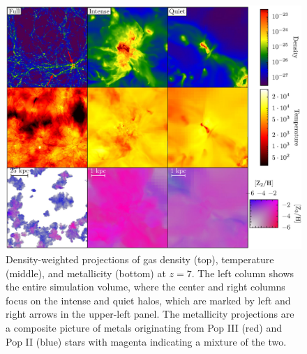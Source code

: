 \documentclass[12pt]{article}
\begin{document}


\clearpage
\begin{figure}
\includegraphics[width=\textwidth]{f1.eps}
\caption{\label{fig:projections} Density-weighted projections of gas
  density (top), temperature (middle), and metallicity (bottom) at
  $z=7$.  The left column shows the entire simulation volume, where
  the center and right columns focus on the intense and quiet halos,
  which are marked by left and right arrows in the upper-left panel.
  The metallicity projections are a composite picture of metals
  originating from Pop III (red) and Pop II (blue) stars with magenta
  indicating a mixture of the two.}
\end{figure}
\end{document}

